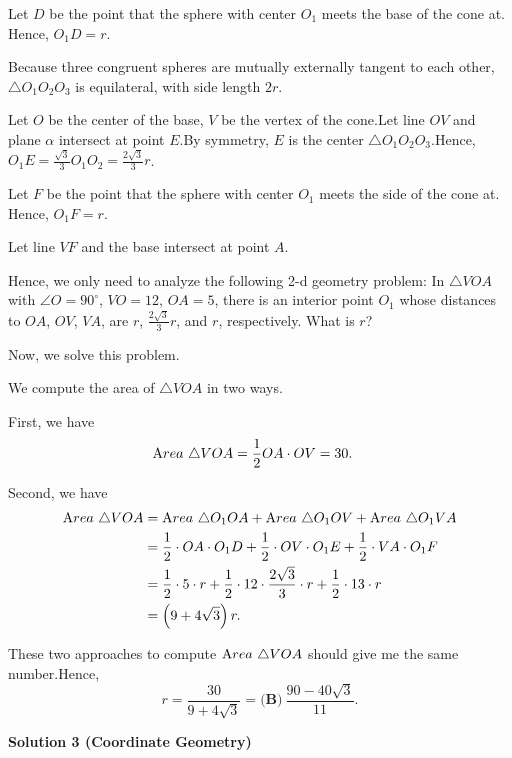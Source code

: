 \begin{enumerate}
 Let $D$ be the point that the sphere with center $O_1$ meets the base of the cone at. Hence, $O_1 D = r$.

 Because three congruent spheres are mutually externally tangent to each other, $\triangle O_1 O_2 O_3$ is equilateral, with side length $2 r$.

 Let $O$ be the center of the base, $V$ be the vertex of the cone.Let line $OV$ and plane $\alpha$ intersect at point $E$.By symmetry, $E$ is the center $\triangle O_1 O_2 O_3$.Hence, $O_1 E = \frac{\sqrt{3}}{3} O_1 O_2 = \frac{2 \sqrt{3}}{3} r$.

 Let $F$ be the point that the sphere with center $O_1$ meets the side of the cone at. Hence, $O_1 F = r$.

 Let line $VF$ and the base intersect at point $A$.

 Hence, we only need to analyze the following 2-d geometry problem: In $\triangle VOA$ with $\angle O = 90^\circ$, $VO = 12$, $OA = 5$, there is an interior point $O_1$ whose distances to $OA$, $OV$, $VA$, are $r$, $\frac{2 \sqrt{3}}{3} r$, and $r$, respectively. What is $r$?

 Now, we solve this problem.

 We compute the area of $\triangle VOA$ in two ways.

 First, we have
 \begin{align*} {\textrm Area} \ \triangle VOA & = \frac{1}{2} OA \cdot OV = 30 . \end{align*}


 Second, we have
 \begin{align*} {\textrm Area} \ \triangle VOA & = {\textrm Area} \ \triangle O_1 OA +  {\textrm Area} \ \triangle O_1 OV +  {\textrm Area} \ \triangle O_1 VA \\ & = \frac{1}{2} \cdot OA \cdot O_1 D + \frac{1}{2} \cdot OV \cdot O_1 E + \frac{1}{2} \cdot VA \cdot O_1 F \\ & = \frac{1}{2} \cdot 5 \cdot r + \frac{1}{2}\cdot 12 \cdot\frac{2 \sqrt{3}}{3}\cdot r + \frac{1}{2} \cdot 13 \cdot r \\ & = \left( 9 + 4 \sqrt{3} \right) r . \end{align*}


 These two approaches to compute ${\textrm Area} \ \triangle VOA$ should give me the same number.Hence,
 \[r = \frac{30}{9 + 4 \sqrt{3}} = \boxed{\textbf{(B)}\ \frac{90-40\sqrt{3}}{11}}.\]




\textbf{Solution 3 (Coordinate Geometry)}


\end{enumerate}
